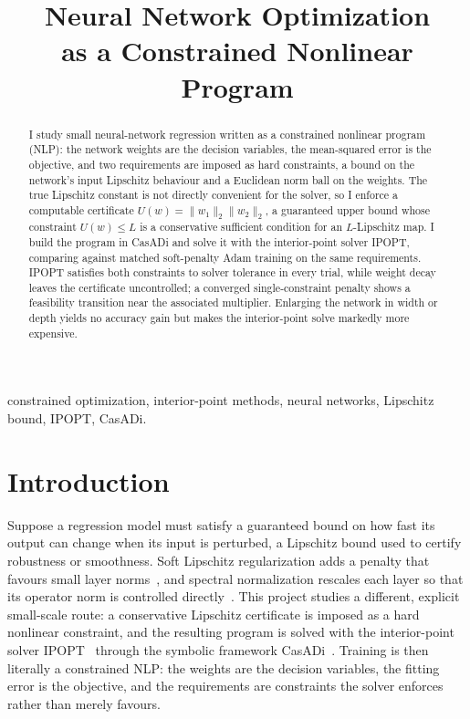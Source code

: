 \documentclass[conference]{IEEEtran}
\newcommand{\wvec}{w}
\newcommand{\Lmax}{L}
\newcommand{\Uc}{U(\wvec)}
\newcommand{\norm}[1]{\lVert #1 \rVert}
\begin{document}
\title{Neural Network Optimization\\
as a Constrained Nonlinear Program}

\author{
}

\maketitle

\begin{abstract}
I study small neural-network regression written as a constrained nonlinear program
(NLP): the network weights are the decision variables, the mean-squared error is the
objective, and two requirements are imposed as hard constraints, a bound on the
network's input Lipschitz behaviour and a Euclidean norm ball on the weights. The
true Lipschitz constant is not directly convenient for the solver, so I enforce a
computable certificate $\Uc=\norm{\wvec_1}_2\norm{\wvec_2}_2$, a guaranteed upper
bound whose constraint $\Uc\le\Lmax$ is a conservative sufficient condition for an
$\Lmax$-Lipschitz map. I build the program in CasADi and solve it with the
interior-point solver IPOPT, comparing against matched soft-penalty Adam training on
the same requirements. IPOPT satisfies both constraints to solver tolerance in every
trial, while weight decay leaves the certificate uncontrolled; a converged
single-constraint penalty shows a feasibility transition near the associated
multiplier. Enlarging the network in width or depth yields no accuracy gain but
makes the interior-point solve markedly more expensive.
\end{abstract}

\begin{IEEEkeywords}
constrained optimization, interior-point methods, neural networks, Lipschitz
bound, IPOPT, CasADi.
\end{IEEEkeywords}

\section{Introduction}
Suppose a regression model must satisfy a guaranteed bound on how fast its output
can change when its input is perturbed, a Lipschitz bound used to certify
robustness or smoothness. Soft Lipschitz regularization adds a penalty that favours
small layer norms~\cite{gouk}, and spectral normalization rescales each layer so
that its operator norm is controlled directly~\cite{miyato}. This project studies a
different, explicit small-scale route: a conservative Lipschitz certificate is
imposed as a hard nonlinear constraint, and the resulting program is solved with the
interior-point solver IPOPT~\cite{ipopt} through the symbolic framework
CasADi~\cite{casadi}. Training is then literally a constrained NLP: the weights are
the decision variables, the fitting error is the objective, and the requirements are
constraints the solver enforces rather than merely favours.
\end{document}
